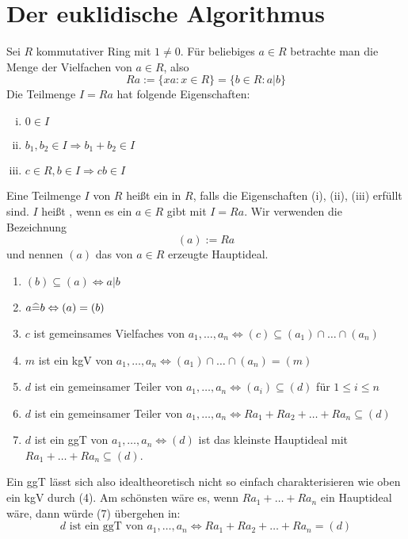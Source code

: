 \section{Der euklidische Algorithmus}
\label{sec:para2}
	Sei $R$ kommutativer Ring mit $1 \neq 0$. Für beliebiges $a \in R$ betrachte man die Menge der Vielfachen von $a \in R$, also
	\[ Ra := \{xa : x \in R\} = \{b \in R : a|b\} \]
	Die Teilmenge $I = Ra$ hat folgende Eigenschaften:
	\begin{enumerate}[(i)]
		\item $0 \in I$
		\item $b_1,b_2 \in I \Rightarrow b_1+b_2 \in I$
		\item $c \in R, b \in I \Rightarrow cb \in I$
	\end{enumerate}
	
\begin{defn} \label{def_2.1}
	Eine Teilmenge $I$ von $R$ heißt ein  in $R$, falls die Eigenschaften (i), (ii), (iii) erfüllt sind. $I$ heißt , wenn es ein $a \in R$ gibt mit $I = Ra$. Wir verwenden die Bezeichnung
	\[ (a) := Ra \]
	und nennen $(a)$ das von $a \in R$ erzeugte Hauptideal.
\end{defn}

	\begin{enumerate}[(1)]
		\item $(b) \subseteq (a) \Leftrightarrow a | b$
		\item $a \widehat{=} b \Leftrightarrow (a) = (b)$
		\item $c$ ist gemeinsames Vielfaches von $a_1,\dots,a_n \Leftrightarrow (c) \subseteq (a_1) \cap \dots \cap (a_n)$
		\item $m$ ist ein kgV von $a_1,\dots,a_n \Leftrightarrow (a_1) \cap \dots \cap (a_n) = (m)$
		\item $d$ ist ein gemeinsamer Teiler von $a_1,\dots,a_n \Leftrightarrow (a_i) \subseteq (d)$ für $1 \leq i \leq n$
		\item $d$ ist ein gemeinsamer Teiler von $a_1,\dots,a_n \Leftrightarrow Ra_1 + Ra_2 + \dots + Ra_n \subseteq (d)$
		\item $d$ ist ein ggT von $a_1,\dots,a_n \Leftrightarrow (d)$ ist das kleinste Hauptideal mit $Ra_1 + \dots + Ra_n \subseteq (d)$.
	\end{enumerate}
	Ein ggT lässt sich also idealtheoretisch nicht so einfach charakterisieren wie oben ein kgV durch (4). Am schönsten wäre es, wenn $Ra_1 + \dots + Ra_n$ ein Hauptideal wäre, dann würde (7) übergehen in:
	\[ d \text{ ist ein ggT von } a_1,\dots,a_n \Leftrightarrow Ra_1+Ra_2+ \dots + Ra_n = (d) \]
	
